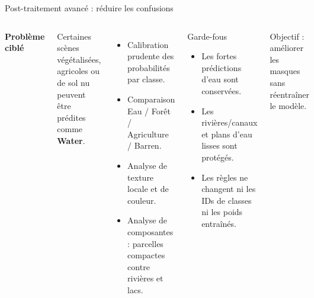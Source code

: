 \documentclass[10pt,aspectratio=169]{beamer}
\newcommand{\highlight}[1]{\textcolor{PfaBlue}{\textbf{#1}}}
\begin{document}
\begin{frame}{Post-traitement avancé : réduire les confusions}
  \begin{columns}[T]
      \textbf{Problème ciblé}\par
      Certaines scènes végétalisées, agricoles ou de sol nu peuvent être prédites comme \highlight{Water}.
      \vspace{0.2cm}
      \begin{itemize}
        \item Calibration prudente des probabilités par classe.
        \item Comparaison Eau / Forêt / Agriculture / Barren.
        \item Analyse de texture locale et de couleur.
        \item Analyse de composantes : parcelles compactes contre rivières et lacs.
      \end{itemize}
      \begin{block}{Garde-fous}
        \begin{itemize}
          \item Les fortes prédictions d'eau sont conservées.
          \item Les rivières/canaux et plans d'eau lisses sont protégés.
          \item Les règles ne changent ni les IDs de classes ni les poids entraînés.
        \end{itemize}
      \end{block}
      \vspace{0.15cm}
      \alert{Objectif : améliorer les masques sans réentraîner le modèle.}
  \end{columns}
\end{frame}
\end{document}
